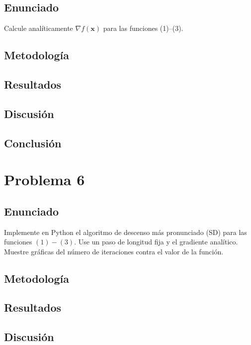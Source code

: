 \documentclass{article}
\begin{document}
\subsection{Enunciado}
Calcule analíticamente $\nabla f(\mathbf{x})$ para las funciones (1)--(3).

\subsection{Metodología}

\subsection{Resultados}
\setcounter{equation}{0}

\subsection{Discusión}

\subsection{Conclusión}

\section{Problema 6}

\subsection{Enunciado}
Implemente en Python el algoritmo de descenso más pronunciado (SD) para las funciones $ (1)-(3) $. Use un paso de longitud fija y el gradiente analítico. Muestre gráficas del número de iteraciones contra el valor de la función.

\subsection{Metodología}

\subsection{Resultados}
\setcounter{equation}{0}

\subsection{Discusión}
\end{document}
